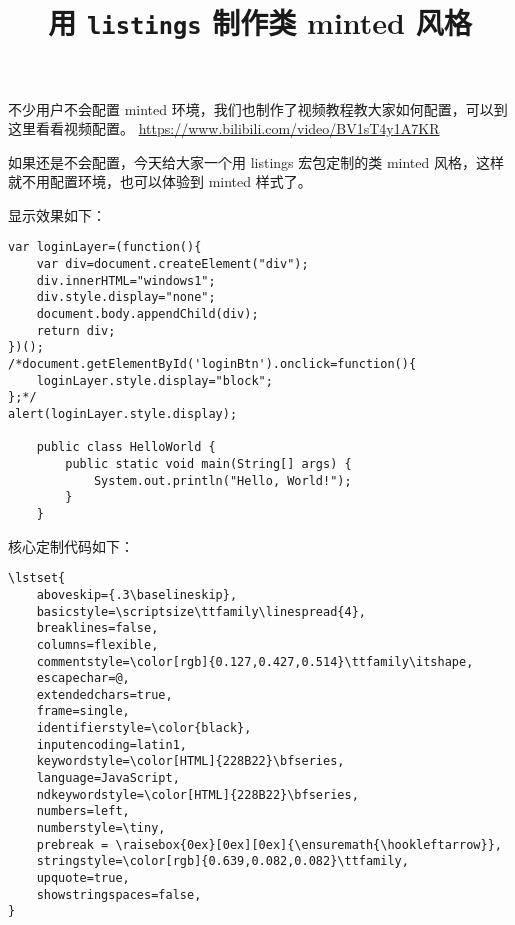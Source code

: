 \documentclass[zihao=-4]{ctexart}
\begin{document}
\title{用  \texttt{listings} 制作类 minted 风格}

\maketitle

不少用户不会配置 minted 环境，我们也制作了视频教程教大家如何配置，可以到这里看看视频配置。
\url{https://www.bilibili.com/video/BV1sT4y1A7KR}


如果还是不会配置，今天给大家一个用
listings 宏包定制的类 minted 风格，这样就不用配置环境，也可以体验到 minted 样式了。



显示效果如下：
\begin{lstlisting}
var loginLayer=(function(){
    var div=document.createElement("div");
    div.innerHTML="windows1";
    div.style.display="none";
    document.body.appendChild(div);
    return div;
})();
/*document.getElementById('loginBtn').onclick=function(){
    loginLayer.style.display="block";
};*/
alert(loginLayer.style.display);

    public class HelloWorld {
        public static void main(String[] args) {
            System.out.println("Hello, World!");
        }
    }
\end{lstlisting}


核心定制代码如下：
\small
\begin{verbatim}
\lstset{
    aboveskip={.3\baselineskip},
    basicstyle=\scriptsize\ttfamily\linespread{4},
    breaklines=false,
    columns=flexible,
    commentstyle=\color[rgb]{0.127,0.427,0.514}\ttfamily\itshape,
    escapechar=@,
    extendedchars=true,
    frame=single,
    identifierstyle=\color{black},
    inputencoding=latin1,
    keywordstyle=\color[HTML]{228B22}\bfseries,
    language=JavaScript,
    ndkeywordstyle=\color[HTML]{228B22}\bfseries,
    numbers=left,
    numberstyle=\tiny,
    prebreak = \raisebox{0ex}[0ex][0ex]{\ensuremath{\hookleftarrow}},
    stringstyle=\color[rgb]{0.639,0.082,0.082}\ttfamily,
    upquote=true,
    showstringspaces=false,
}
\end{verbatim}

%
\end{document}
